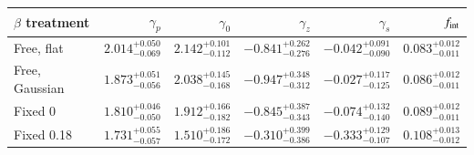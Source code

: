 \begin{tabular}{lrrrrr}
\toprule
$\beta$ treatment & $\gamma_p$ & $\gamma_0$ & $\gamma_z$ & $\gamma_s$ & $f_{\rm int}$ \\
\midrule
Free, flat & $2.014_{-0.069}^{+0.050}$ & $2.142_{-0.112}^{+0.101}$ & $-0.841_{-0.276}^{+0.262}$ & $-0.042_{-0.090}^{+0.091}$ & $0.083_{-0.011}^{+0.012}$ \\
Free, Gaussian & $1.873_{-0.056}^{+0.051}$ & $2.038_{-0.168}^{+0.145}$ & $-0.947_{-0.312}^{+0.348}$ & $-0.027_{-0.125}^{+0.117}$ & $0.086_{-0.011}^{+0.012}$ \\
Fixed 0 & $1.810_{-0.050}^{+0.046}$ & $1.912_{-0.182}^{+0.166}$ & $-0.845_{-0.343}^{+0.387}$ & $-0.074_{-0.140}^{+0.132}$ & $0.089_{-0.011}^{+0.012}$ \\
Fixed 0.18 & $1.731_{-0.057}^{+0.055}$ & $1.510_{-0.172}^{+0.186}$ & $-0.310_{-0.386}^{+0.399}$ & $-0.333_{-0.107}^{+0.129}$ & $0.108_{-0.012}^{+0.013}$ \\
\bottomrule
\end{tabular}
